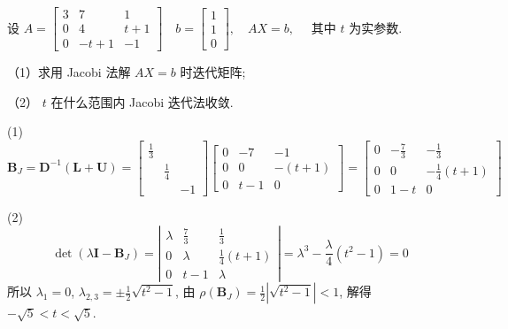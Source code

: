 \begin{tcolorbox}[breakable,
		colframe=white!10!jingga, coltitle=white!90!jingga, colback=white!95!jingga, coltext=black, colbacktitle=white!10!jingga, enhanced, fonttitle=\bfseries,fontupper=\normalsize, attach boxed title to top left={yshift=-2mm}, before skip=8pt, after skip=8pt,
		title=解答题]

设 $ A=\left[\begin{array}{ccc}3 & 7 & 1 \\ 0 & 4 & t+1 \\ 0 & -t+1 & -1\end{array}\right] \quad b=\left[\begin{array}{l}1 \\ 1 \\ 0\end{array}\right], \quad A X=b, \quad $ 其中 $ t $ 为实参数.

（1）求用 Jacobi 法解 $ A X=b $ 时迭代矩阵;

（2） $ t $ 在什么范围内 Jacobi 迭代法收敛.

\tcblower
(1)
$$
\boldsymbol{B}_{J}=\boldsymbol{D}^{-1}(\boldsymbol{L}+\boldsymbol{U})=\left[\begin{array}{ccc}
\frac{1}{3} &  &  \\
 & \frac{1}{4} &  \\
 &  & -1
\end{array}\right]\left[\begin{array}{ccc}
0 & -7 & -1 \\
0 & 0 & -(t+1) \\
0 & t-1 & 0
\end{array}\right]=\left[\begin{array}{ccc}
0 & -\frac{7}{3} & -\frac{1}{3} \\
0 & 0 & -\frac{1}{4}(t+1) \\
0 & 1-t & 0
\end{array}\right]
$$

(2)
$$\operatorname{det}\left(\lambda \boldsymbol{I}-\boldsymbol{B}_{J}\right)=\left|\begin{array}{ccc}
\lambda & \frac{7}{3} & \frac{1}{3} \\
0 & \lambda & \frac{1}{4}(t+1) \\
0 & t-1 & \lambda
\end{array}\right|=\lambda^{3}-\frac{\lambda}{4}\left(t^{2}-1\right)=0$$
所以 $ \lambda_1=0 $, $ \lambda_{2,3}=\pm\frac{1}{2} \sqrt{t^{2}-1} $, 由 $ \rho\left(\boldsymbol{B}_{J}\right)=\frac{1}{2} |\sqrt{t^{2}-1}|<1 $, 解得 $  -\sqrt{5}<t<\sqrt{5} $.
\end{tcolorbox}


